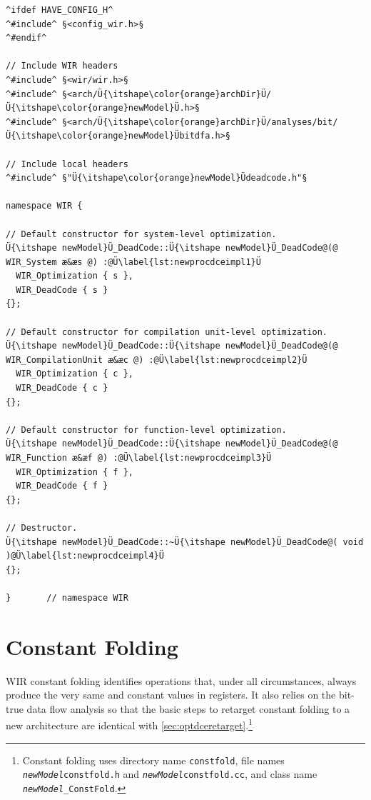 \begin{lstlisting}[style=code,float=!t,caption={Rudimentary Implementation of a New Processor Model's Dead Code Elimination},label=lst:newprocdceimpl]
^ifdef HAVE_CONFIG_H^
^#include^ §<config_wir.h>§
^#endif^

// Include WIR headers
^#include^ §<wir/wir.h>§
^#include^ §<arch/Ü{\itshape\color{orange}archDir}Ü/Ü{\itshape\color{orange}newModel}Ü.h>§
^#include^ §<arch/Ü{\itshape\color{orange}archDir}Ü/analyses/bit/Ü{\itshape\color{orange}newModel}Übitdfa.h>§

// Include local headers
^#include^ §"Ü{\itshape\color{orange}newModel}Üdeadcode.h"§

namespace WIR {

// Default constructor for system-level optimization.
Ü{\itshape newModel}Ü_DeadCode::Ü{\itshape newModel}Ü_DeadCode@(@ WIR_System æ&æs @) :@Ü\label{lst:newprocdceimpl1}Ü
  WIR_Optimization { s },
  WIR_DeadCode { s }
{};

// Default constructor for compilation unit-level optimization.
Ü{\itshape newModel}Ü_DeadCode::Ü{\itshape newModel}Ü_DeadCode@(@ WIR_CompilationUnit æ&æc @) :@Ü\label{lst:newprocdceimpl2}Ü
  WIR_Optimization { c },
  WIR_DeadCode { c }
{};

// Default constructor for function-level optimization.
Ü{\itshape newModel}Ü_DeadCode::Ü{\itshape newModel}Ü_DeadCode@(@ WIR_Function æ&æf @) :@Ü\label{lst:newprocdceimpl3}Ü
  WIR_Optimization { f },
  WIR_DeadCode { f }
{};

// Destructor.
Ü{\itshape newModel}Ü_DeadCode::~Ü{\itshape newModel}Ü_DeadCode@( void )@Ü\label{lst:newprocdceimpl4}Ü
{};

}       // namespace WIR
\end{lstlisting}


\section{Constant Folding}
\label{sec:optcfoldretarget}

\gls{WIR} constant folding identifies operations that, under all circumstances, always produce the very same and constant values in registers.
It also relies on the bit-true data flow analysis so that the basic steps to retarget constant folding to a new architecture are identical with \cref{sec:optdceretarget}.\footnote{Constant folding uses directory name \texttt{constfold}, file names \texttt{{\itshape newModel}constfold.h} and \texttt{{\itshape newModel}constfold.cc}, and class name \texttt{{\itshape newModel}\_ConstFold}.}


